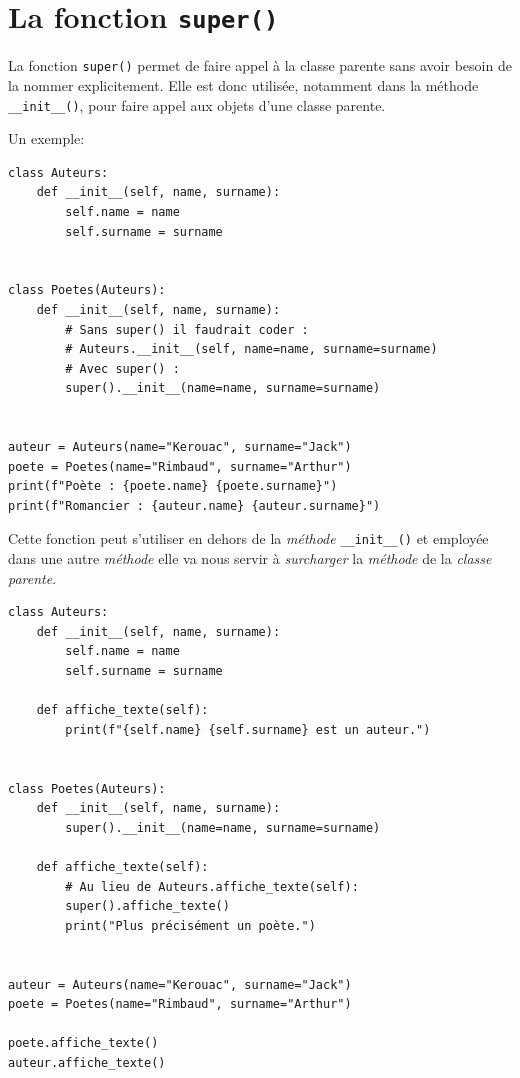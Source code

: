 \documentclass[a4paper,11pt]{book}
\begin{document}
\section{La fonction \texttt{super()}}
La fonction \texttt{super()} permet de faire appel à la classe parente sans avoir besoin de la nommer explicitement. Elle est donc utilisée, notamment dans la méthode \verb|__init__()|, pour faire appel aux objets d'une classe parente.
\medskip

Un exemple:
\begin{lstlisting}[caption=Fonction \texttt{super()} et méthode \texttt{.\_\_init\_\_()}]
class Auteurs:
    def __init__(self, name, surname):
        self.name = name
        self.surname = surname


class Poetes(Auteurs):
    def __init__(self, name, surname):
        # Sans super() il faudrait coder :
        # Auteurs.__init__(self, name=name, surname=surname)
        # Avec super() :
        super().__init__(name=name, surname=surname)


auteur = Auteurs(name="Kerouac", surname="Jack")
poete = Poetes(name="Rimbaud", surname="Arthur")
print(f"Poète : {poete.name} {poete.surname}")
print(f"Romancier : {auteur.name} {auteur.surname}")
\end{lstlisting}
\medskip

Cette fonction peut s'utiliser en dehors de la \textit{méthode} \verb|__init__()| et employée dans une autre \textit{méthode} elle va nous servir à \textit{surcharger} la \textit{méthode} de la \textit{classe parente}.
\medskip

\begin{lstlisting}[caption=Surcharge d'une \textit{méthode} de la \textit{classe parente}]
class Auteurs:
    def __init__(self, name, surname):
        self.name = name
        self.surname = surname

    def affiche_texte(self):
        print(f"{self.name} {self.surname} est un auteur.")


class Poetes(Auteurs):
    def __init__(self, name, surname):
        super().__init__(name=name, surname=surname)

    def affiche_texte(self):
        # Au lieu de Auteurs.affiche_texte(self):
        super().affiche_texte()  
        print("Plus précisément un poète.")


auteur = Auteurs(name="Kerouac", surname="Jack")
poete = Poetes(name="Rimbaud", surname="Arthur")

poete.affiche_texte()
auteur.affiche_texte()
\end{lstlisting}
\medskip
\end{document}
